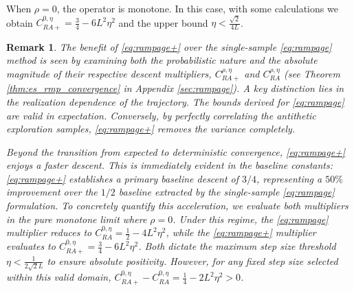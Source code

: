 \documentclass[letter,11pt]{article}
\newtheorem{remark}{\textbf{Remark}}
\begin{document}
When $\rho=0$, the operator is monotone. In this case, with some calculations we obtain $C_{RA+}^{0,\eta} = \frac{3}{4} - 6L^2\eta^2$ and the upper bound $\eta < \frac{\sqrt{2}}{4L}$. 

\begin{remark}\label{rem:var}
The benefit of \eqref{eq:rampage+} over the single-sample \eqref{eq:rampage} method is seen by examining both the probabilistic nature and the absolute magnitude of their respective descent multipliers, $C_{RA+}^{\rho,\eta}$ and $C_{RA}^{\rho,\eta}$ (see Theorem \ref{thm:es_rmp_convergence} in Appendix \ref{sec:rampage}). A key distinction lies in the realization dependence of the trajectory. The bounds derived for \eqref{eq:rampage} are valid in expectation. Conversely, by perfectly correlating the antithetic exploration samples, \eqref{eq:rampage+} removes the variance completely.

Beyond the transition from expected to deterministic convergence, \eqref{eq:rampage+} enjoys a faster descent. This is immediately evident in the baseline constants: \eqref{eq:rampage+} establishes a primary baseline descent of $3/4$, representing a $50\%$ improvement over the $1/2$ baseline extracted by the single-sample \eqref{eq:rampage} formulation. To concretely quantify this acceleration, we evaluate both multipliers in the pure monotone limit where $\rho = 0$. Under this regime, the \eqref{eq:rampage} multiplier reduces to $C_{RA}^{0,\eta} = \frac{1}{2} - 4L^2\eta^2$, while the \eqref{eq:rampage+} multiplier evaluates to $C_{RA+}^{0,\eta} = \frac{3}{4} - 6L^2\eta^2$. Both dictate the maximum step size threshold $\eta < \frac{1}{2\sqrt{2}L}$ to ensure absolute positivity. However, for any fixed step size selected within this valid domain, $C_{RA+}^{0,\eta} - C_{RA}^{0,\eta} = \frac{1}{4} - 2L^2\eta^2 > 0$. 
\end{remark}
\end{document}
